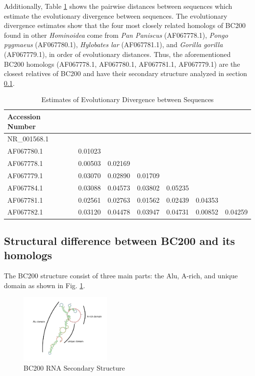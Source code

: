 \documentclass[conference, 11pt]{IEEEtran}
\begin{document}
Additionally, Table \ref{tbl:distances} shows the pairwise distances between sequences which estimate the evolutionary divergence between sequences. 
The evolutionary divergence estimates show that the four most closely related homologs of BC200 found in other \emph{Hominoidea} come from \emph{Pan Paniscus} (AF067778.1), \emph{Pongo pygmaeus} (AF067780.1), \emph{Hylobates lar} (AF067781.1), and \emph{Gorilla gorilla} (AF067779.1), in order of evolutionary distances. 
Thus, the aforementioned BC200 homologs (AF067778.1, AF067780.1, AF067781.1, AF067779.1) are the closest relatives of BC200 and have their secondary structure analyzed in section \ref{sec:results-structure}.

\begin{table}[h]
  \centering
  \caption{Estimates of Evolutionary Divergence between Sequences}
  \label{tbl:distances}
  \begin{tabular}{lcccccc}
    \toprule
    Accession Number \\
    \midrule
    NR\_001568.1 \\
    AF067780.1 & 0.01023 \\
    AF067778.1 & 0.00503 & 0.02169 \\
    AF067779.1 & 0.03070 & 0.02890 & 0.01709 \\ 
    AF067784.1 & 0.03088 & 0.04573 & 0.03802 & 0.05235 \\
    AF067781.1 & 0.02561 & 0.02763 & 0.01562 & 0.02439 & 0.04353 \\ 
    AF067782.1 & 0.03120 & 0.04478 & 0.03947 & 0.04731 & 0.00852 & 0.04259 \\
    \bottomrule
  \end{tabular}
\end{table}

\subsection{Structural difference between BC200 and its homologs}\label{sec:results-structure}

The BC200 structure consist of three main parts: the Alu, A-rich, and unique domain \cite{jung2014rna} as shown in Fig. \ref{fig:bc200-structure}.

\begin{figure}[h]
  \centering
  \includegraphics[width=0.4\textwidth]{figs/rna-6.png}
  \caption{BC200 RNA Secondary Structure}
  \label{fig:bc200-structure}
\end{figure}
\end{document}
